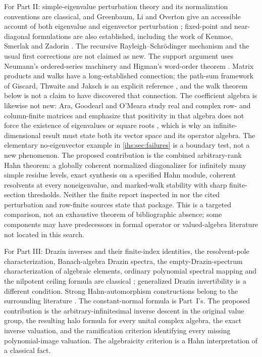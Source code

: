 \documentclass[11pt,a4paper]{article}
\numberwithin{equation}{section}
\theoremstyle{definition}
\theoremstyle{remark}
\begin{document}
For Part II: simple-eigenvalue perturbation theory and its normalization
conventions are classical, and Greenbaum, Li and Overton give an accessible
account of both eigenvalue and eigenvector perturbation \cite{glo};
fixed-point and near-diagonal formulations are also established, including
the work of Kenmoe, Smerlak and Zadorin \cite{ksz}. The recursive
Rayleigh--Schr\"odinger mechanism and the usual first corrections are not
claimed as new. The support argument uses Neumann's ordered-series machinery
\cite{Neumann} and Higman's word-order theorem \cite{Higman}. Matrix
products and walks have a long-established connection; the path-sum
framework of Giscard, Thwaite and Jaksch is an explicit reference
\cite{pathsum}, and the walk theorem below is not a claim to have discovered
that connection. The coefficient algebra is likewise not new: Ara, Goodearl
and O'Meara study real and complex row- and column-finite matrices and
emphasize that positivity in that algebra does not force the existence of
eigenvalues or square roots \cite{ago}, which is why an infinite-dimensional
result must state both its vector space and its operator algebra. The
elementary no-eigenvector example in \cref{ihs:sec:failures} is a boundary
test, not a new phenomenon. The proposed contribution is the combined
arbitrary-rank Hahn theorem: a globally coherent normalized diagonalizer for
infinitely many simple residue levels, exact synthesis on a specified Hahn
module, coherent resolvents at every noneigenvalue, and marked-walk
stability with sharp finite-section thresholds. Neither the finite report
inspected in \cite{RepoPinB} nor the cited perturbation and row-finite
sources state that package. This is a targeted comparison, not an exhaustive
theorem of bibliographic absence; some components may have predecessors in
formal operator or valued-algebra literature not located in this search.

For Part III: Drazin inverses and their finite-index identities, the
resolvent-pole characterization, Banach-algebra Drazin spectra, the
empty-Drazin-spectrum characterization of algebraic elements, ordinary
polynomial spectral mapping and the nilpotent ceiling formula are classical
\cite{Drazin,BoassoOperators,Boasso}; generalized Drazin invertibility
\cite{Koliha} is a different condition. Strong Hahn-automorphism
constructions belong to the surrounding literature \cite{KaplanKrappSerra}.
The constant-normal formula is Part~I's. The proposed contribution is the
arbitrary-infinitesimal inverse descent in the original value group, the
resulting halo formula for every unital complex algebra, the exact inverse
valuation, and the ramification criterion identifying every missing
polynomial-image valuation. The algebraicity criterion is a Hahn
interpretation of a classical fact.
\end{document}

